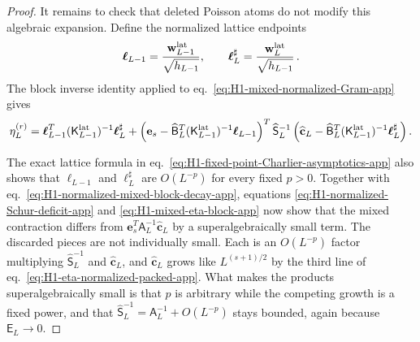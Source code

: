 \documentclass[a4paper,11pt]{article}
\theoremstyle{definition}
\theoremstyle{remark}
\begin{document}
\begin{proof}
It remains to check that deleted Poisson atoms do not modify this
algebraic expansion. Define the normalized lattice endpoints
\begin{equation}
   \boldsymbol\ell_{L-1}
   =\frac{\mathbf w_{L-1}^{\rm lat}}{\sqrt{h_{L-1}}},
   \qquad
   \boldsymbol\ell_L^\sharp
   =\frac{\mathbf w_L^{\rm lat}}{\sqrt{h_{L-1}}}\,.
\end{equation}
The block inverse identity applied to
eq.~\eqref{eq:H1-mixed-normalized-Gram-app} gives
\begin{equation}
\begin{aligned}
   \eta_L^{(r)}
   =
   \boldsymbol\ell_{L-1}^T
   (\mathsf K_{L-1}^{\rm lat})^{-1}
   \boldsymbol\ell_L^\sharp
   +
   \left(
      \mathbf e_s
      -\widehat{\mathsf B}_L^T
      (\mathsf K_{L-1}^{\rm lat})^{-1}
      \boldsymbol\ell_{L-1}
   \right)^T
   \widehat{\mathsf S}_L^{-1}
   \left(
      \widehat{\mathbf c}_L
      -\widehat{\mathsf B}_L^T
      (\mathsf K_{L-1}^{\rm lat})^{-1}
      \boldsymbol\ell_L^\sharp
   \right).
\end{aligned}
   \label{eq:H1-mixed-eta-block-app}
\end{equation}

The exact lattice formula in
eq.~\eqref{eq:H1-fixed-point-Charlier-asymptotics-app} also shows that
\(\boldsymbol\ell_{L-1}\) and \(\boldsymbol\ell_L^\sharp\) are
\(O(L^{-p})\) for every fixed \(p>0\). Together with
eq.~\eqref{eq:H1-normalized-mixed-block-decay-app}, equations
\eqref{eq:H1-normalized-Schur-deficit-app} and
\eqref{eq:H1-mixed-eta-block-app} now show that the mixed contraction
differs from
\(\mathbf e_s^T\mathsf A_L^{-1}\widehat{\mathbf c}_L\) by a
superalgebraically small term.
The discarded pieces are not individually small. Each is an $O(L^{-p})$ factor multiplying
$\widehat{\mathsf S}_L^{-1}$ and $\widehat{\mathbf c}_L$, and $\widehat{\mathbf c}_L$ grows like
$L^{(s+1)/2}$ by the third line of eq.~\eqref{eq:H1-eta-normalized-packed-app}. What makes the
products superalgebraically small is that $p$ is arbitrary while the competing growth is a fixed
power, and that $\widehat{\mathsf S}_L^{-1}=\mathsf A_L^{-1}+O(L^{-p})$ stays bounded, again
because $\mathsf E_L\to0$.
\end{proof}
\end{document}
